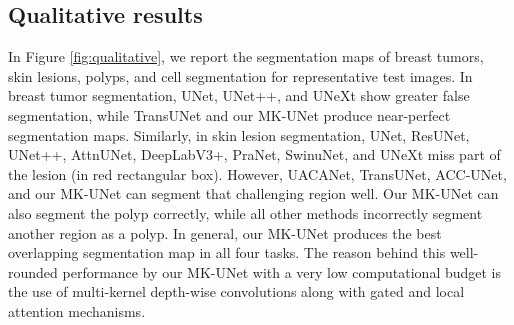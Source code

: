 \subsection{Qualitative results}
\label{ssec:qualitative_results}

In Figure \ref{fig:qualitative}, we report the segmentation maps of breast tumors, skin lesions, polyps, and cell segmentation for representative test images. In breast tumor segmentation, UNet, UNet++, and UNeXt show greater false segmentation, while TransUNet and our MK-UNet produce near-perfect segmentation maps. Similarly, in skin lesion segmentation, UNet, ResUNet, UNet++, AttnUNet, DeepLabV3+, PraNet, SwinuNet, and UNeXt miss part of the lesion (in red rectangular box). However, UACANet, TransUNet, ACC-UNet, and our MK-UNet can segment that challenging region well. Our MK-UNet can also segment the polyp correctly, while all other methods incorrectly segment another region as a polyp. In general, our MK-UNet produces the best overlapping segmentation map in all four tasks. The reason behind this well-rounded performance by our MK-UNet with a very low computational budget is the use of multi-kernel depth-wise convolutions along with gated and local attention mechanisms.

